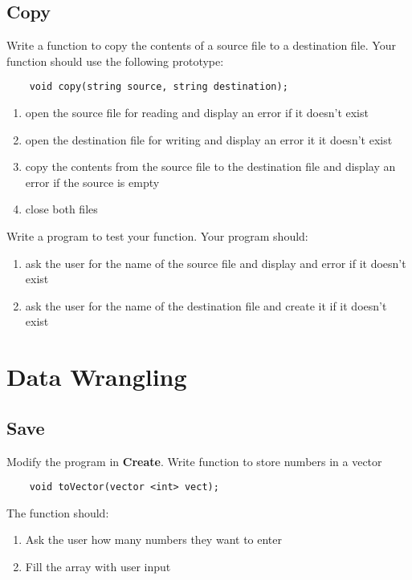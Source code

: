 \documentclass{article}
\begin{document}
\subsection{Copy}
Write a function to copy the contents of a source file to a destination file. Your function should use the following prototype:
\begin{verbatim}
	void copy(string source, string destination);
\end{verbatim}
\begin{enumerate}
	\item open the source file for reading and display an error if it doesn't exist
	\item open the destination file for writing and display an error it it doesn't exist
	\item copy the contents from the source file to the destination file and display an error if the source is empty
	\item close both files
\end{enumerate}
Write a program to test your function. Your program should:
\begin{enumerate}
	\item ask the user for the name of the source file and display and error if it doesn't exist
	\item ask the user for the name of the destination file and create it if it doesn't exist
\end{enumerate}

\section{Data Wrangling}
\subsection{Save}
Modify the program in \textbf{Create}. Write function to store numbers in a vector
\begin{verbatim}
	void toVector(vector <int> vect);
\end{verbatim}
The function should:
\begin{enumerate}
	\item Ask the user how many numbers they want to enter
	\item Fill the array with user input
\end{enumerate}
\end{document}
